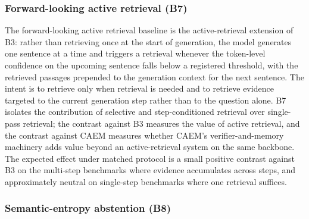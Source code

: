 \subsubsection{Forward-looking active retrieval (B7)}
\label{sec:comp-flare}

The forward-looking active retrieval baseline \cite{jiang-etal-2023-active} is the active-retrieval extension of B3: rather than retrieving once at the start of generation, the model generates one sentence at a time and triggers a retrieval whenever the token-level confidence on the upcoming sentence falls below a registered threshold, with the retrieved passages prepended to the generation context for the next sentence. The intent is to retrieve only when retrieval is needed and to retrieve evidence targeted to the current generation step rather than to the question alone. B7 isolates the contribution of selective and step-conditioned retrieval over single-pass retrieval; the contrast against B3 measures the value of active retrieval, and the contrast against CAEM measures whether CAEM's verifier-and-memory machinery adds value beyond an active-retrieval system on the same backbone. The expected effect under matched protocol is a small positive contrast against B3 on the multi-step benchmarks where evidence accumulates across steps, and approximately neutral on single-step benchmarks where one retrieval suffices.

\subsubsection{Semantic-entropy abstention (B8)}
\label{sec:comp-semantic-entropy}

